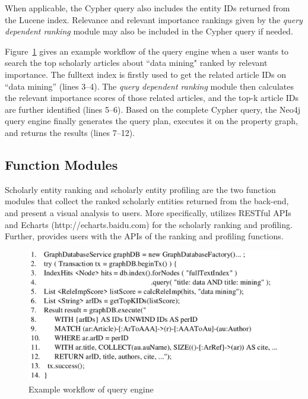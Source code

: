 When applicable, the Cypher query also includes the entity IDs returned from the Lucene index. Relevance and relevant importance rankings given by the {\em query dependent ranking} module may also be included in the Cypher query if needed.




Figure~\ref{fig:queryProcess} gives an example workflow of the query engine when a user wants to search the top scholarly articles about ``data mining" ranked by relevant importance. The fulltext index is firstly used to get the related article IDs on ``data mining'' (lines 3--4). The {\em query dependent ranking} module then calculates the relevant importance scores of those related articles, and the top-k article IDs are further identified (lines 5--6). Based on the complete Cypher query, the Neo4j query engine finally generates the query plan, executes it on the property graph, and returns the results (lines 7--12).







\subsection{Function Modules}
Scholarly entity ranking and scholarly entity profiling are the two function modules that collect the ranked scholarly entities returned from the back-end, and present a visual analysis to users. More specifically, \oursystem utilizes RESTful APIs  and Echarts {\scriptsize (http://echarts.baidu.com)} for the scholarly ranking and profiling. Further, \oursystem provides users with the APIs of the ranking and profiling functions.


\begin{figure}
\centering
\includegraphics[width=\columnwidth]{queryProcess.pdf}
\vspace{-3.5ex}
\caption{Example workflow of \oursystem query engine}
\label{fig:queryProcess}
\vspace{-2ex}
\end{figure}




